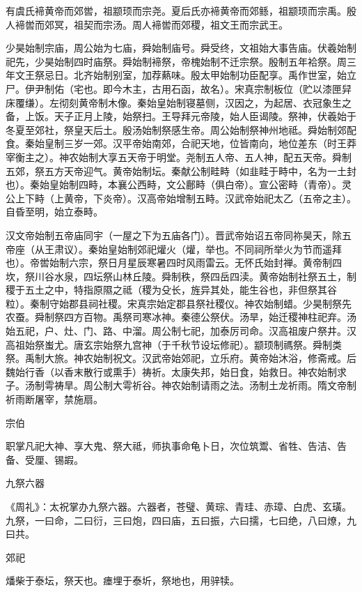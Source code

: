 \documentclass[a4paper,12pt,UTF8,twoside]{ctexbook}
\begin{document}
    有虞氏褅黄帝而郊喾，祖颛顼而宗尧。夏后氏亦褅黄帝而郊鲧，祖颛顼而宗禹。殷人褅喾而郊冥，祖契而宗汤。周人褅喾而郊稷，祖文王而宗武王。
    
    少昊始制宗庙，周公始为七庙，舜始制庙号。舜受终，文祖始大事告庙。伏羲始制祀先，少昊始制四时庙祭。舜始制褅祭，帝槐始制不迁宗祭。殷制五年袷祭。周三年文王祭忌日。北齐始制别室，加荐爇味。殷太甲始制功臣配享。禹作世室，始立尸。伊尹制佑（宅也。即今木主，古用石函，故名）。宋真宗制板位（贮以漆匣舁床覆缣）。左彻刻黄帝制木像。秦始皇始制寝墓侧，汉因之，为起居、衣冠象生之备，上饭。天子正月上陵，始祭扫。王导拜元帝陵，始人臣谒陵。祭神，伏羲始于冬夏至郊社，祭皇天后土。殷汤始制祭感生帝。周公始制祭神州地祗。舜始制郊配食。秦始皇制三岁一郊。汉平帝始南郊，合祀天地，位皆南向，地位差东（时王莽宰衡主之）。神农始制大享五天帝于明堂。尧制五人帝、五人神，配五天帝。舜制五郊，祭五方天帝迎气。黄帝始制坛。秦献公制畦畤（如韭畦于畤中，名为一土封也）。秦始皇始制四畤，本襄公西畤，文公鄜畤（俱白帝）。宣公密畤（青帝）。灵公上下畤（上黄帝，下炎帝）。汉高帝始增制五畤。汉武帝始祀太乙（五帝之主）。自昏至明，始立泰畤。
    
    汉文帝始制五帝庙同宇（一屋之下为五庙各门）。晋武帝始诏五帝同祢昊天，除五帝座（从王肃议）。秦始皇始制郊祀爟火（爟，举也。不同祠所举火为节而遥拜也）。帝喾始制六宗，祭日月星辰寒暑四时风雨雷云。无怀氏始封禅。黄帝制四坎，祭川谷水泉，四坛祭山林丘陵。舜制秩，祭四岳四渎。黄帝始制社祭五土，制稷于五土之中，特指原隰之祗（稷为殳长，旌异其处，能生谷也，非但祭其谷粒）。秦制守始郡县祠社稷。宋真宗始定郡县祭社稷仪。神农始制蜡。少昊制祭先农蚕。舜制祭四方百物。禹祭司寒冰神。秦德公祭伏。汤旱，始迁稷神柱祀弃。汤始五祀，户、灶、门、路、中溜。周公制七祀，加泰厉司命。汉高祖废户祭井。汉高祖始祭蚩尤。唐玄宗始祭九宫神（于千秋节设坛修祀）。颛顼制禡祭。舜制类祭。禹制大旅。神农始制祝文。汉武帝始郊祀，立乐府。黄帝始沐浴，修斋戒。后魏始行香（以香末散行或熏手）祷祈。太康失邦，始日食，始救日。神农始制求子。汤制雩祷旱。周公制大雩祈谷。神农始制请雨之法。汤制土龙祈雨。隋文帝制祈雨断屠宰，禁施扇。
    
    宗伯
    
    职掌凡祀大神、享大鬼、祭大祗，师执事命龟卜日，次位筑鬻、省牲、告洁、告备、受厘、锡嘏。
    
    九祭六器
    
    《周礼》：太祝掌办九祭六器。六器者，苍璧、黄琮、青珪、赤璋、白虎、玄璜。九祭，一曰命，二曰衍，三曰炮，四曰庙，五曰振，六曰擩，七曰绝，八曰燎，九曰共。
    
    郊祀
    
    燔柴于泰坛，祭天也。瘗埋于泰圻，祭地也，用骍犊。
    
\end{document}
